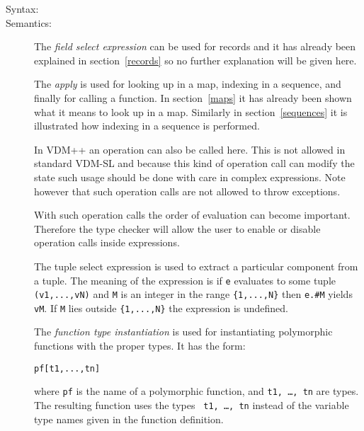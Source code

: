 \documentclass[\pformat,12pt]{article}
\newcommand{\vdmslpp}[2]{%
#2
}
\newcommand{\vdmpp}{VDM++}
\begin{document}
\begin{description}
\item[Syntax:]




    
\item[Semantics:] The {\it field select expression} can be used for records
  and it has already been explained in section~\ref{records} so no further
  explanation will be given here.
     
  The {\it apply} is used for looking up in a map, indexing in a
  sequence, and finally for calling a function. In section~\ref{maps} it
  has already been shown what it means to look up in a map. Similarly in
  section~\ref{sequences} it is illustrated how indexing in a sequence is
  performed.

  In  \vdmslpp{VDM-SL}{\vdmpp} an operation can also be called 
  here. This is not allowed in standard VDM-SL and because this kind of
  operation call can modify the state such usage should be done with
  care in complex expressions. Note however that such operation calls
  are not allowed to throw exceptions.

  With such operation calls the order of evaluation can become
  important. Therefore the type checker will allow the user to enable
  or disable operation calls inside expressions.

  The tuple select expression is used to extract a particular
  component from a tuple. The meaning of the expression is if
  \texttt{e} evaluates to some tuple
  \texttt{(v1,...,vN)} and \texttt{M} is an integer in the
  range \verb+{1,...,N}+ then \texttt{e.\#M} yields \texttt{vM}. If
  \texttt{M} lies outside \verb+{1,...,N}+ the expression is undefined.

  The {\it function type instantiation\/} is used for instantiating
  polymorphic functions with the proper types. It has the form:
  \begin{alltt}
    pf [ t1, ..., tn ]
  \end{alltt}
  where {\tt pf} is the name of a polymorphic function, and {\tt t1,
    \ldots, tn} are types. The resulting function uses the types {\tt
    t1, \ldots, tn} instead of the variable type names given in the
  function definition.


\end{description}
\end{document}
